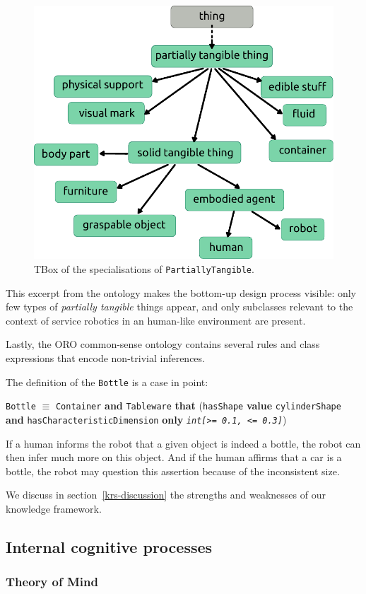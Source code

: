 \documentclass[preprint,5p]{elsarticle}
\newcommand{\concept}[1]{{\small \texttt{#1}}}
\begin{document}
\begin{figure}
    \centering
    \includegraphics[width=0.6\columnwidth]{tangible_things_tbox.pdf}
    \caption{TBox of the specialisations of \concept{PartiallyTangible}.}
    \label{fig|tangible_things_tbox}
\end{figure}

This excerpt from the ontology makes the bottom-up design process visible: only
few types of \emph{partially tangible} things appear, and only subclasses
relevant to the context of service robotics in an human-like environment are
present.

Lastly, the ORO common-sense ontology contains several rules and class
expressions that encode non-trivial inferences.

The definition of the \concept{Bottle} is a case in point:

\concept{Bottle} $\equiv$ \concept{Container} {\bf and} \concept{Tableware}
{\bf that} (\concept{hasShape} {\bf value} \concept{cylinderShape} {\bf and}
\concept{hasCharacteristicDimension} {\bf only} \concept{\em int[>= 0.1, <=
0.3]})

If a human informs the robot that a given object is indeed a bottle, the robot
can then infer much more on this object. And if the human affirms that a car is
a bottle, the robot may question this assertion because of the inconsistent
size.

We discuss in section~\ref{krs-discussion} the strengths and weaknesses of our
knowledge framework.

\subsection{Internal cognitive processes}
\label{sect|intern}

\subsubsection{Theory of Mind}
\label{sect|tom}
\end{document}
